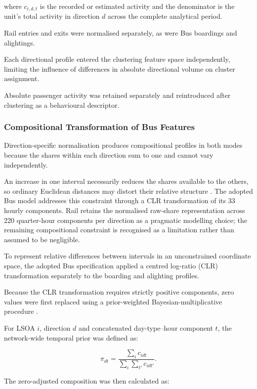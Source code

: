 where $c_{i,d,t}$ is the recorded or estimated activity and the denominator is the unit's total activity in direction $d$ across the complete analytical period.

Rail entries and exits were normalised separately, as were Bus boardings and alightings.

Each directional profile entered the clustering feature space independently, limiting the influence of differences in absolute directional volume on cluster assignment.

Absolute passenger activity was retained separately and reintroduced after clustering as a behavioural descriptor.

\subsubsection{Compositional Transformation of Bus Features}

Direction-specific normalisation produces compositional profiles in both modes because the shares within each direction sum to one and cannot vary independently.

An increase in one interval necessarily reduces the shares available to the others, so ordinary Euclidean distances may distort their relative structure \citep{Aitchison1982}. The adopted Bus model addresses this constraint through a CLR transformation of its 33 hourly components. Rail retains the normalised raw-share representation across 220 quarter-hour components per direction as a pragmatic modelling choice; the remaining compositional constraint is recognised as a limitation rather than assumed to be negligible.

To represent relative differences between intervals in an unconstrained coordinate space, the adopted Bus specification applied a centred log-ratio (CLR) transformation separately to the boarding and alighting profiles.

Because the CLR transformation requires strictly positive components, zero values were first replaced using a prior-weighted Bayesian-multiplicative procedure \citep{MartinFernandez2015}.

For LSOA $i$, direction $d$ and concatenated day-type--hour component $t$, the network-wide temporal prior was defined as:

\begin{equation}
\pi_{dt} = \frac{\sum_i c_{idt}}{\sum_i \sum_{t'} c_{idt'}}.
\end{equation}

The zero-adjusted composition was then calculated as:

